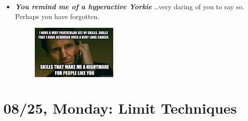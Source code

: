 \documentclass[11pt,letterpaper]{article}
\begin{document}
\begin{itemize}
\item {\bfseries\itshape You remind me of a hyperactive Yorkie} \dots very daring of you to say so. Perhaps you have forgotten. 
	\begin{figure}[H]
	\centering
	\includegraphics[width=0.4\textwidth]{images/skills.jpg}
	\end{figure}
\end{itemize}

\newpage
\section*{08/25, Monday: Limit Techniques\label{08-25}}
\end{document}
